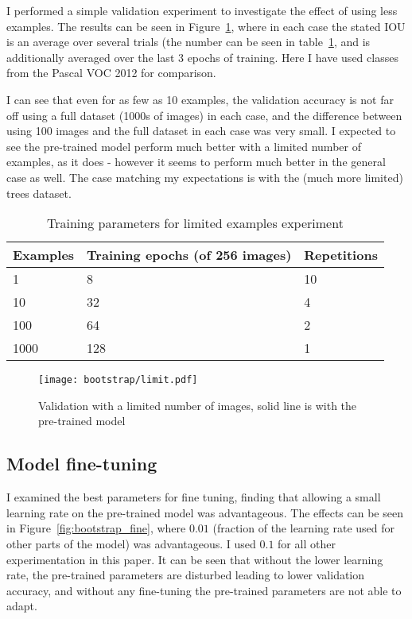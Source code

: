 I performed a simple validation experiment to investigate the effect of using less examples. The results can be seen in Figure~\ref{fig:bootstrap_limited}, where in each case the stated IOU is an average over several trials (the number can be seen in table~\ref{fig:bootstrap_limit_params}, and is additionally averaged over the last 3 epochs of training. Here I have used classes from the Pascal VOC 2012 for comparison.

I can see that even for as few as 10 examples, the validation accuracy is not far off using a full dataset (1000s of images) in each case, and the difference between using 100 images and the full dataset in each case was very small. I expected to see the pre-trained model perform much better with a limited number of examples, as it does - however it seems to perform much better in the general case as well. The case matching my expectations is with the (much more limited) trees dataset.


\begin{table}[ht]
  \centering
    \caption{Training parameters for limited examples experiment}

  \begin{tabular}{ l  l  l}
    Examples & Training epochs (of 256 images) & Repetitions \\
    \toprule
    1 	  & 8 	& 10 \\
    10 	  & 32 	& 4  \\
    100   & 64 	& 2 \\
    1000  & 128 & 1 \\
    \bottomrule
  \end{tabular}
\label{fig:bootstrap_limit_params}
\end{table}



\begin{figure}[ht]
\centering
\texttt{[image: bootstrap/limit.pdf]}
\caption{Validation with a limited number of images, solid line is with the pre-trained model}  
\label{fig:bootstrap_limited}
\end{figure}



\subsection{Model fine-tuning}

I examined the best parameters for fine tuning, finding that allowing a small learning rate on the pre-trained model was advantageous. The effects can be seen in Figure~\ref{fig:bootstrap_fine}, where $0.01$ (fraction of the learning rate used for other parts of the model) was advantageous. I used $ 0.1 $ for all other experimentation in this paper. It can be seen that without the lower learning rate, the pre-trained parameters are disturbed leading to lower validation accuracy, and without any fine-tuning the pre-trained parameters are not able to adapt.

